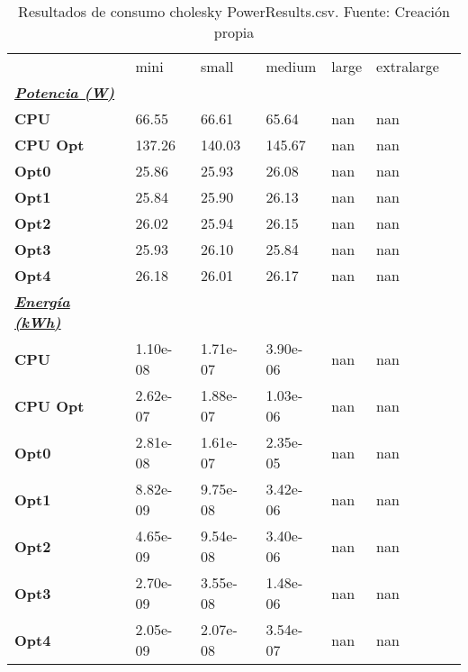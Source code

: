 \begin{table}[H]
    \centering
    \begin{tabular}{lllllll}
    \rowcolor[HTML]{DAE8FC} \ & mini & small & medium & 	large & 	extralarge \\
    \cellcolor[HTML]{DAE8FC} \textbf{\textbf{{\emph{{\underline{{Potencia (W)}}}}}}} &  &  &  & 	 & 	 \\
    \rowcolor[HTML]{EFEFEF} \cellcolor[HTML]{DAE8FC} \textbf{CPU} & 66.55 & 66.61 & 65.64 & 	nan & 	nan \\
    \cellcolor[HTML]{DAE8FC} \textbf{CPU Opt} & 137.26 & 140.03 & 145.67 & 	nan & 	nan \\
    \rowcolor[HTML]{EFEFEF} \cellcolor[HTML]{DAE8FC} \textbf{Opt0} & 25.86 & 25.93 & 26.08 & 	nan & 	nan \\
    \cellcolor[HTML]{DAE8FC} \textbf{Opt1} & 25.84 & 25.90 & 26.13 & 	nan & 	nan \\
    \rowcolor[HTML]{EFEFEF} \cellcolor[HTML]{DAE8FC} \textbf{Opt2} & 26.02 & 25.94 & 26.15 & 	nan & 	nan \\
    \cellcolor[HTML]{DAE8FC} \textbf{Opt3} & 25.93 & 26.10 & 25.84 & 	nan & 	nan \\
    \rowcolor[HTML]{EFEFEF} \cellcolor[HTML]{DAE8FC} \textbf{Opt4} & 26.18 & 26.01 & 26.17 & 	nan & 	nan \\
    \cellcolor[HTML]{DAE8FC} \textbf{\textbf{{\emph{{\underline{{Energía (kWh)}}}}}}} &  &  &  & 	 & 	 \\
    \rowcolor[HTML]{EFEFEF} \cellcolor[HTML]{DAE8FC} \textbf{CPU} & 1.10e-08 & 1.71e-07 & 3.90e-06 & 	nan & 	nan \\
    \cellcolor[HTML]{DAE8FC} \textbf{CPU Opt} & 2.62e-07 & 1.88e-07 & 1.03e-06 & 	nan & 	nan \\
    \rowcolor[HTML]{EFEFEF} \cellcolor[HTML]{DAE8FC} \textbf{Opt0} & 2.81e-08 & 1.61e-07 & 2.35e-05 & 	nan & 	nan \\
    \cellcolor[HTML]{DAE8FC} \textbf{Opt1} & 8.82e-09 & 9.75e-08 & 3.42e-06 & 	nan & 	nan \\
    \rowcolor[HTML]{EFEFEF} \cellcolor[HTML]{DAE8FC} \textbf{Opt2} & 4.65e-09 & 9.54e-08 & 3.40e-06 & 	nan & 	nan \\
    \cellcolor[HTML]{DAE8FC} \textbf{Opt3} & 2.70e-09 & 3.55e-08 & 1.48e-06 & 	nan & 	nan \\
    \rowcolor[HTML]{EFEFEF} \cellcolor[HTML]{DAE8FC} \textbf{Opt4} & 2.05e-09 & 2.07e-08 & 3.54e-07 & 	nan & 	nan \\
    \end{tabular}
    \caption[Resultados de consumo cholesky PowerResults.csv]{{Resultados de consumo cholesky PowerResults.csv. Fuente: Creación propia}}
    \label{table_global_cholesky_PowerResults_data}
\end{table}